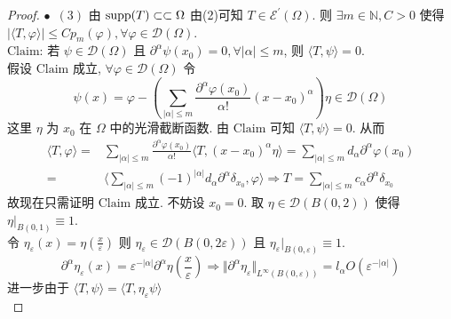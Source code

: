 \documentclass[11pt]{ctexart}[UTF8]
\begin{document}
\begin{proof}
    $\bullet$\  $(3)$ 由 $\operatorname{supp}(T) \subset\subset \Omega$ 由(2)可知 $T \in \mathscr{E}^{\prime}(\Omega)$. 则 $\exists m \in \mathbb{N}, C>0$ 使得 $\left| \langle T, \varphi \rangle \right| \leq C p_{m}(\varphi) ,\forall \varphi \in \mathscr{D}(\Omega)$.\\
    $\mathrm{Claim}$: 若 $\psi \in \mathscr{D}(\Omega)$ 且 $\partial^{\alpha} \psi(x_0) = 0, \forall |\alpha| \leq m$, 则 $\langle T, \psi \rangle = 0$.\\
    假设 $\mathrm{Claim}$ 成立, $\forall \varphi \in \mathscr{D}(\Omega)$ 令
    \begin{equation*}
        \psi(x) = \varphi - \left(\sum\limits_{|\alpha| \leq m} \frac{\partial^{\alpha} \varphi(x_0)}{\alpha!} (x-x_0)^{\alpha}\right)\eta \in \mathscr{D}(\Omega)
    \end{equation*}
    这里 $\eta$ 为 $x_0$ 在 $\Omega$ 中的光滑截断函数. 由 $\mathrm{Claim}$ 可知 $\langle T, \psi \rangle = 0$. 从而
    \begin{equation*}
        \begin{aligned}
            \langle T, \varphi \rangle = & \sum\limits_{|\alpha| \leq m} \frac{\partial^{\alpha} \varphi(x_0)}{\alpha!} \langle T, (x-x_0)^{\alpha} \eta \rangle = \sum\limits_{|\alpha| \leq m} d_{\alpha} \partial^{\alpha} \varphi(x_0)\\
            = & \langle \sum\limits_{|\alpha| \leq m} (-1)^{|\alpha|}d_{\alpha} \partial^{\alpha} \delta_{x_0}, \varphi \rangle \Longrightarrow T = \sum\limits_{|\alpha| \leq m} c_{\alpha} \partial^{\alpha} \delta_{x_0}
        \end{aligned}
    \end{equation*}
    故现在只需证明 $\mathrm{Claim}$ 成立. 不妨设 $x_0 = 0$. 取 $\eta \in \mathscr{D}(B(0,2))$ 使得 $\eta\big|_{B(0,1)} \equiv 1$.\\
    令 $\eta_{\varepsilon}(x) = \eta(\frac{x}{\varepsilon})$ 则 $\eta_{\varepsilon} \in \mathscr{D}(B(0,2\varepsilon))$ 且 $\eta_{\varepsilon}\big|_{B(0,\varepsilon)} \equiv 1$.\\
    \begin{equation*}
        \partial^{\alpha} \eta_{\varepsilon} (x) = \varepsilon^{-|\alpha|} \partial^{\alpha} \eta(\frac{x}{\varepsilon}) \Longrightarrow \Vert \partial^{\alpha} \eta_{\varepsilon} \Vert_{L^{\infty}(B(0,\varepsilon))} = l_{\alpha}O(\varepsilon^{-|\alpha|})
    \end{equation*}
    进一步由于 $\langle T, \psi \rangle = \langle T, \eta_{\varepsilon} \psi \rangle$
    \begin{equation*}

\end{equation*}
\end{proof}
\end{document}
